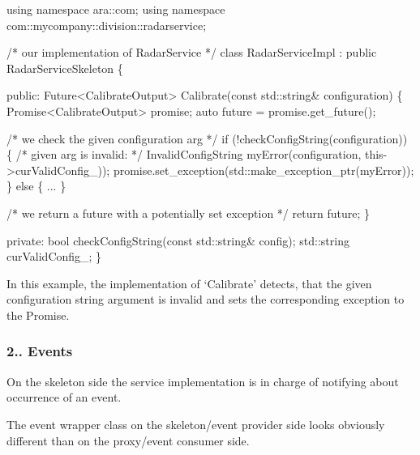 \begin{DoxyCode}
\textcolor{keyword}{using namespace }ara::com;
\textcolor{keyword}{using namespace }com::mycompany::division::radarservice;

\textcolor{comment}{/* our implementation of RadarService */}
\textcolor{keyword}{class }RadarServiceImpl : \textcolor{keyword}{public} RadarServiceSkeleton \{

\textcolor{keyword}{public}:
Future<CalibrateOutput> Calibrate(\textcolor{keyword}{const} std::string& configuration)
\{
Promise<CalibrateOutput> promise;
\textcolor{keyword}{auto} future = promise.get\_future();

\textcolor{comment}{/* we check the given configuration arg */}
\textcolor{keywordflow}{if} (!checkConfigString(configuration)) \{
\textcolor{comment}{/* given arg is invalid: */}
InvalidConfigString myError(configuration, this->curValidConfig\_));
promise.set\_exception(std::make\_exception\_ptr(myError));
\} \textcolor{keywordflow}{else} \{
...
\}

\textcolor{comment}{/* we return a future with a potentially set exception */}
\textcolor{keywordflow}{return} future;
\}

\textcolor{keyword}{private}:
\textcolor{keywordtype}{bool} checkConfigString(\textcolor{keyword}{const} std::string& config);
std::string curValidConfig\_;
\}
\end{DoxyCode}



\begin{DoxyItemize}
\item In this example, the implementation of ‘\+Calibrate’ detects, that the given configuration string argument is invalid and sets the corresponding exception to the Promise.
\end{DoxyItemize}

\subsubsection*{2.. Events}


\begin{DoxyItemize}
\item On the skeleton side the service implementation is in charge of notifying about occurrence of an event.
\item The event wrapper class on the skeleton/event provider side looks obviously different than on the proxy/event consumer side.
\end{DoxyItemize}


